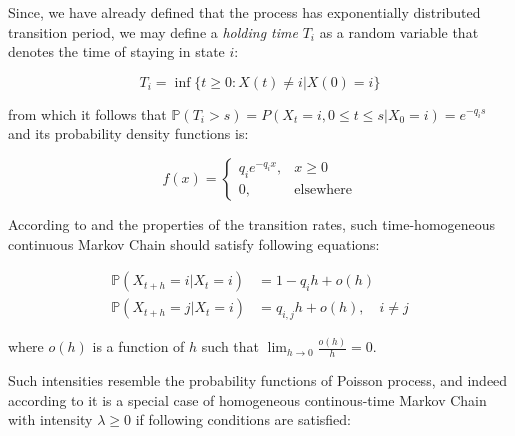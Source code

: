 Since, we have already defined that the process has exponentially distributed transition period, we may define a \textit{holding time} $T_i$ as a random variable that denotes the time of staying in state $i$:

\begin{equation}
T_i = \inf \{t \geq 0 : X(t) \neq i | X(0) = i\}
\end{equation}

from which it follows that $\mathbb{P}(T_i>s) = P(X_t=i,0 \leq t \leq s|X_0=i) = e^{-q_i s}$ and its probability density functions is:

\begin{equation}
    f(x) = 
    \begin{cases}
        q_i e^{-q_i x}, & x \geq 0\\
        0, & \text{elsewhere}
    \end{cases}
\end{equation}

According to \citep{Praskova2012} and the properties of the transition rates, such time-homogeneous continuous Markov Chain should satisfy following equations:

\begin{equation}
    \begin{aligned}
        \mathbb{P}(X_{t+h}=i|X_t=i) &= 1 - q_i h + o(h) \\
        \mathbb{P}(X_{t+h}=j|X_t=i) &= q_{i,j} h + o(h), \quad i \neq j
    \end{aligned}
\end{equation}

where $o(h)$ is a function of $h$ such that $\lim_{h \to 0} \frac{o(h)}{h} = 0$.

Such intensities resemble the probability functions of Poisson process, and indeed according to \citep{Norris2012} it is a special case of homogeneous continous-time Markov Chain with intensity $\lambda \geq 0$ if following conditions are satisfied:

